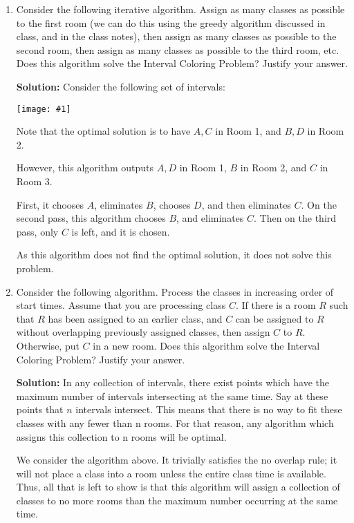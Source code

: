\documentclass{article}
\providecommand{\soln}{\textbf{Solution: }}
\providecommand{\image}[1]{
    \begin{center}
        \texttt{[image: \#1]}
    \end{center}
}
\begin{document}
    \begin{enumerate}[label=\Alph*.]
        \item Consider the following iterative algorithm. Assign as many classes as possible to the first room (we can do this using the greedy algorithm discussed in class, and in the class notes), then assign as many classes as possible to the second room, then assign as many classes as possible to the third room, etc. Does this algorithm solve the Interval Coloring Problem? Justify your answer.
        
        \soln Consider the following set of intervals:
        
        \image{p2a_counterexample}
        
        Note that the optimal solution is to have $A,C$ in Room 1, and $B, D$ in Room 2.
        
        However, this algorithm outputs $A, D$ in Room 1, $B$ in Room 2, and $C$ in Room 3.
        
        First, it chooses $A$, eliminates $B$, chooses $D$, and then eliminates $C$. On the second pass, this algorithm chooses $B$, and eliminates $C$.
        Then on the third pass, only $C$ is left, and it is chosen.
        
        As this algorithm does not find the optimal solution, it does not solve this problem.
        
        \item Consider the following algorithm. Process the classes in increasing order of start times. Assume that you are processing class $C$. If there is a room $R$ such that $R$ has been assigned to an earlier class, and $C$ can be assigned to $R$ without overlapping previously assigned classes, then assign $C$ to $R$. Otherwise, put $C$ in a new room. Does this algorithm solve the Interval Coloring Problem?
        Justify your answer.
        
        \soln In any collection of intervals, there exist points which have the maximum number of intervals intersecting at the same time.
	Say at these points that $n$ intervals intersect.
	This means that there is no way to fit these classes with any fewer than n rooms.
	For that reason, any algorithm which assigns this collection to n rooms will be optimal.

	We consider the algorithm above.
	It trivially satisfies the no overlap rule; it will not place a class into a room unless the entire class time is available.
	Thus, all that is left to show is that this algorithm will assign a collection of classes to no more rooms than the maximum number occurring at the same time.


\end{enumerate}
\end{document}
